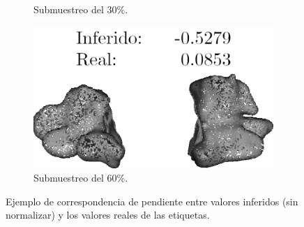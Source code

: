 \begin{figure}[htp]
\begin{subfigure}[b]{0.31\textwidth}
  \caption{Submuestreo del 30\%.}
\end{subfigure}\hspace{10pt}
  \begin{subfigure}[b]{0.31\textwidth}
  \centering
    \includegraphics[width=\textwidth]{imagenes/chapter6/Maxiliar100014_11.png}
  \caption{Submuestreo del 60\%.}
  \end{subfigure}
  \caption{Ejemplo de correspondencia de pendiente entre valores inferidos (sin normalizar) y 
  los valores reales de las etiquetas.} 
  \label{fig:Cualitativos}
\end{figure}

